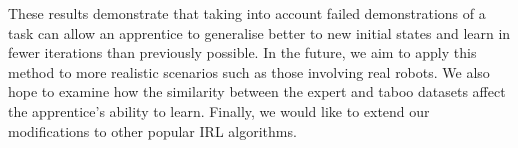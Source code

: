 \documentclass[conference]{IEEEtran}
\begin{document}
These results demonstrate that taking into account failed demonstrations of a task can allow an apprentice to generalise better to new initial states and learn in fewer iterations than previously possible.  In the future, we aim to apply this method to more realistic scenarios such as those involving real robots. We also hope to examine how the similarity between the expert and taboo datasets affect the apprentice's ability to learn. Finally, we would like to extend our modifications to other popular IRL algorithms.

%
%
%
%
%
%
%
%
%  
%
\end{document}
